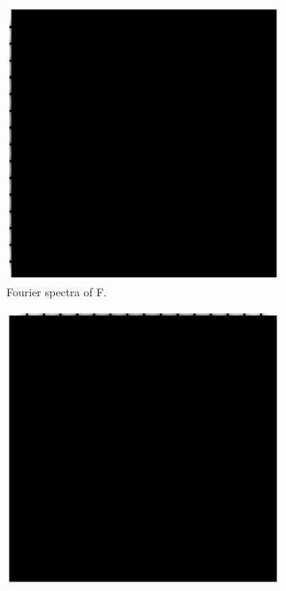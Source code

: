 \documentclass[11pt,a4paper]{article}
\begin{document}
\begin{figure}[!ht]
	\footnotesize
	\centering 
	\begin{subfigure}[t]{.32\linewidth} %
	\includegraphics[width=\columnwidth]{Linearity_Fhat_Abs_Log.eps}
	\caption{Fourier spectra of F.}
	\label{fig:Fhat_Abs_Log}
	\end{subfigure}
	\begin{subfigure}[t]{.32\linewidth} %
	\includegraphics[width=.95\columnwidth]{Linearity_Ghat_Abs_Log.eps}

\end{subfigure}
\end{figure}
\end{document}
